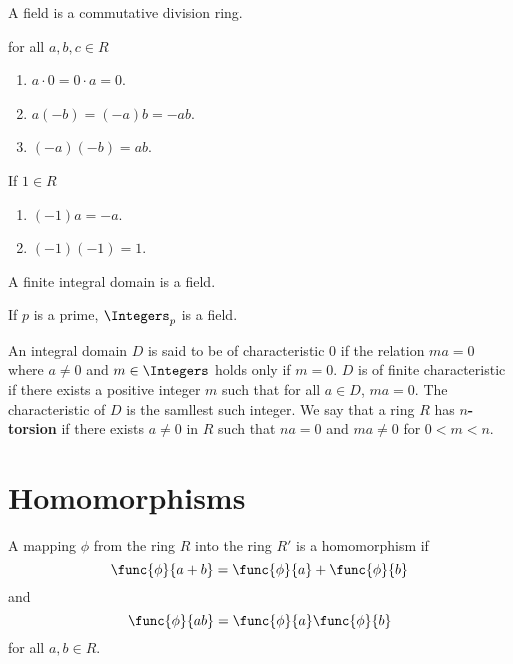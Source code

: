 \begin{definition}
    A field is a commutative division ring.
\end{definition}

\begin{lemma}
    for all \(a,b,c \in R\)
    \begin{enumerate}
        \item \(a \cdot 0 = 0 \cdot a = 0\).
        \item \(a(-b) = (-a)b = -ab\).
        \item \((-a)(-b) = ab\).
    \end{enumerate}
    If \(1 \in R\)
    \begin{enumerate}
        \item \((-1)a = -a\).
        \item \((-1)(-1) = 1\).
    \end{enumerate}
\end{lemma}

\begin{lemma}
    A finite integral domain is a field.
\end{lemma}

\begin{corollary}
    If \(p\) is a prime, \(\Integers_p\) is a field.
\end{corollary}

\begin{definition}
    An integral domain \(D\) is said to be of characteristic \(0\) if the relation \(ma  = 0\) where \(a \neq 0\) and \(m \in \Integers\) holds only if \(m = 0\). \(D\) is of finite characteristic if there exists a positive integer \(m\) such that for all \(a \in D\), \(ma = 0\). The characteristic of \(D\) is the samllest such integer. We say that a ring \(R\) has \textbf{\(n\)-torsion} if there exists \(a \neq 0\) in \(R\) such that \(na = 0\) and \(ma \neq 0\) for \(0 < m < n\).
\end{definition}

\section{Homomorphisms}
\begin{definition}
    A mapping \(\phi\) from the ring \(R\) into the ring \(R'\) is a homomorphism if 
    \begin{equation*}
        \func{\phi}{a + b} = \func{\phi}{a} + \func{\phi}{b}
    \end{equation*}
    and 
    \begin{equation*}
        \func{\phi}{ab} = \func{\phi}{a} \func{\phi}{b}
    \end{equation*}
    for all \(a,b\in R\).
\end{definition}

